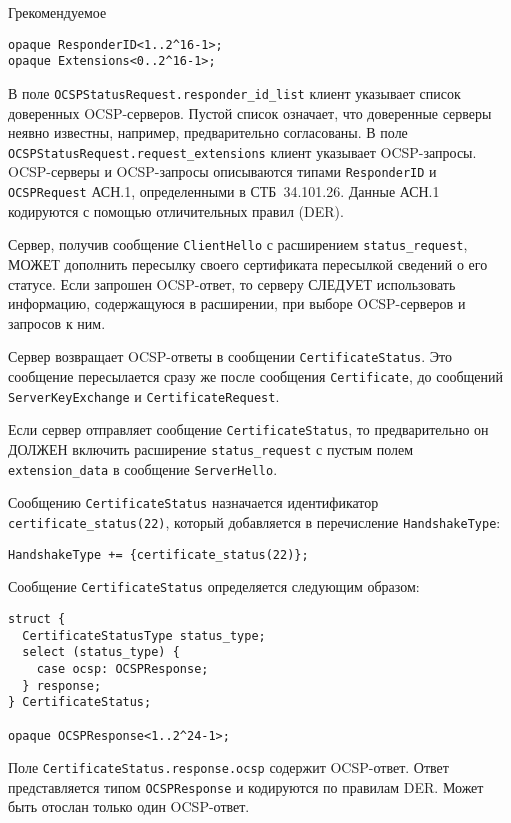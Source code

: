 \begin{appendix}{Г}{рекомендуемое}
\begin{lstlisting}
opaque ResponderID<1..2^16-1>;
opaque Extensions<0..2^16-1>;
\end{lstlisting}

В поле \lstinline{OCSPStatusRequest.responder_id_list} клиент указывает список
доверенных OCSP-серверов. Пустой список означает, что доверенные серверы неявно
известны, например, предварительно согласованы. В поле 
\lstinline{OCSPStatusRequest.request_extensions} клиент указывает  
OCSP-запросы. OCSP-серверы и OCSP-запросы описываются типами 
\lstinline{ResponderID} и \lstinline{OCSPRequest} АСН.1, определенными
в СТБ~34.101.26. Данные АСН.1 кодируются с помощью отличительных правил 
(DER).

Сервер, получив сообщение \lstinline{ClientHello} с расширением
\lstinline{status_request}, МОЖЕТ дополнить пересылку своего сертификата
пересылкой сведений о его статусе. Если запрошен OCSP-ответ, то серверу СЛЕДУЕТ 
использовать информацию, содержащуюся в расширении, при выборе OCSP-серверов и 
запросов к ним. 

Сервер возвращает OCSP-ответы в сообщении \lstinline{CertificateStatus}. Это 
сообщение пересылается сразу же после сообщения \lstinline{Certificate}, до 
сообщений \lstinline{ServerKeyExchange} и \lstinline{CertificateRequest}.

Если сервер отправляет сообщение \lstinline{CertificateStatus}, то 
предварительно он ДОЛЖЕН включить расширение \lstinline{status_request} с 
пустым полем \lstinline{extension_data} в сообщение \lstinline{ServerHello}.

Сообщению \lstinline{CertificateStatus} назначается идентификатор 
\lstinline{certificate_status(22)}, который добавляется в перечисление
\lstinline{HandshakeType}:
\begin{lstlisting}
HandshakeType += {certificate_status(22)};
\end{lstlisting}

Сообщение \lstinline{CertificateStatus} определяется следующим образом:
\begin{lstlisting}
struct {
  CertificateStatusType status_type;
  select (status_type) {
    case ocsp: OCSPResponse;
  } response;
} CertificateStatus;

opaque OCSPResponse<1..2^24-1>;
\end{lstlisting}

Поле \lstinline{CertificateStatus.response.ocsp} содержит OCSP-ответ. Ответ
представляется типом \lstinline{OCSPResponse} и кодируются по правилам DER.
Может быть отослан только один OCSP-ответ.


\end{appendix}
